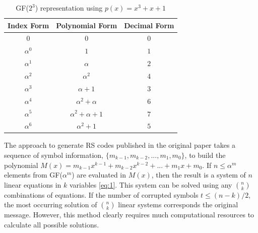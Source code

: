 \documentclass[conference]{IEEEtran}
\begin{document}
\begin{table}[!hbt]
\captionsetup{justification=centering, labelsep=newline}
\centering
\label{tab:t1}
\caption{GF($2^3$) representation using $p(x) = x^3 + x + 1$ } 
\begin{tabular}{ccc}
\toprule
Index Form  & Polynomial Form & Decimal Form                                                                                                    \\
\midrule
$0$ & $0$ & $0$                                                                                              \\
$\alpha^0$ & $1$ & $1$                                                                                         \\
$\alpha^1$ & $\alpha$ & $2$
\\
$\alpha^2$ & $\alpha^2$ & $4$                                                                                        
\\
$\alpha^3$ & $\alpha + 1$ & $3$                                                                                        
\\
$\alpha^4$ & $\alpha^2 + \alpha$ & $6$                                                                                        
\\
$\alpha^5$ & $\alpha^2 + \alpha + 1$ & $7$                                                                                        
\\
$\alpha^6$ & $\alpha^2 + 1$ & $5$                                                                                        
\\
\bottomrule
\end{tabular}
\end{table}

\par The approach to generate RS codes published in the original paper \cite{b2} takes a sequence of symbol information, $\{m_{k - 1}, m_{k - 2}, ..., m_1, m_0\}$, to build the polynomial $M(x) = m_{k-1}x^{k-1} + m_{k-2}x^{k-2} + ... + m_{1}x + m_0$. If $n \leq \alpha^m$ elements from GF($\alpha^m$) are evaluated in $M(x)$, then the result is a system of $n$ linear equations in $k$ variables \eqref{eq:1}. This system can be solved using any $n \choose k$ combinations of equations. If the number of corrupted symbols $t \leq (n - k)/2$, the most occurring solution of $n \choose k$ linear systems corresponds the original message. However, this method clearly requires much computational resources to calculate all possible solutions.  
\end{document}

